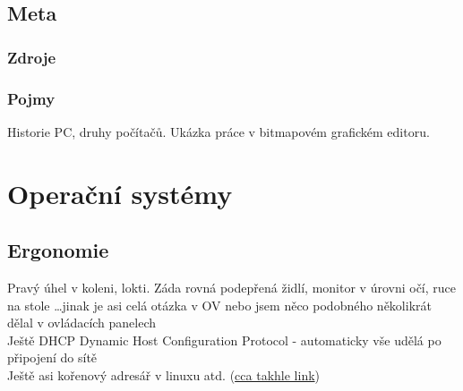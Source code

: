 \documentclass[12pt]{article}
\begin{document}
\subsection{Meta}
\subsubsection{Zdroje}
\subsubsection{Pojmy}
Historie PC, druhy počítačů. Ukázka práce v bitmapovém grafickém editoru.

\section{Operační systémy}
\subsection{Ergonomie}
Pravý úhel v koleni, lokti. Záda rovná podepřená židlí, monitor v úrovni očí, ruce na stole \dots jinak je asi celá otázka v OV nebo jsem něco podobného několikrát dělal v ovládacích panelech\\
Ještě DHCP Dynamic Host Configuration Protocol - automaticky vše udělá po připojení do sítě\\
Ještě asi kořenový adresář v linuxu atd. (\href{https://www.howtogeek.com/117435/htg-explains-the-linux-directory-structure-explained/}{cca takhle link})
\end{document}
